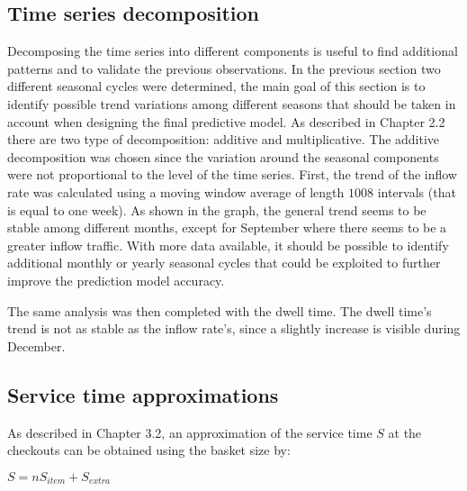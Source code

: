 \subsection{Time series decomposition}
\label{subsec:time_series_decomposition}
Decomposing the time series into different components is useful to find additional patterns and to validate the previous observations. In the previous section two different seasonal cycles were determined, the main goal of this section is to identify possible trend variations among different seasons that should be taken in account when designing the final predictive model. As described in Chapter 2.2 there are two type of decomposition: additive and multiplicative. The additive decomposition was chosen since the variation around the seasonal components were not proportional to the level of the time series.
First, the trend of the inflow rate was calculated using a moving window average of length $ 1008 $ intervals (that is equal to one week). As shown in the graph, the general trend seems to be stable among different months, except for September where there seems to be a greater inflow traffic. With more data available, it should be possible to identify additional monthly or yearly seasonal cycles that could be exploited to further improve the prediction model accuracy.

The same analysis was then completed with the dwell time. The dwell time’s trend is not as stable as the inflow rate’s, since a slightly increase is visible during December.

\subsection{Service time approximations}
\label{subsec:service_time_approximations}
As described in Chapter 3.2, an approximation of the service time $ S $ at the checkouts can be obtained using the basket size by:

$ S = n S_{item} + S_{extra} $


